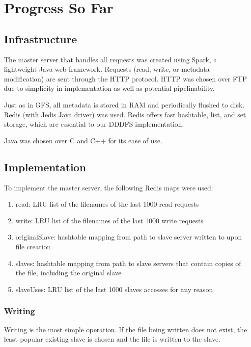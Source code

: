 \documentclass{article}
\begin{document}
\section{Progress So Far}

\subsection{Infrastructure}

The master server that handles all requests was created using Spark, a lightweight Java web framework. Requests (read, write, or metadata modification) are sent through the HTTP protocol. HTTP was chosen over FTP due to simplicity in implementation as well as potential pipelinability. 

Just as in GFS, all metadata is stored in RAM and periodically flushed to disk. Redis (with Jedis Java driver) was used. Redis offers fast hashtable, list, and set storage, which are essential to our DDDFS implementation. 

Java was chosen over C and C++ for its ease of use. 

\subsection{Implementation}

To implement the master server, the following Redis maps were used:
\begin{enumerate}
\item read: LRU list of the filenames of the last 1000 read requests
\item write: LRU list of the filenames of the last 1000 write requests
\item originalSlave: hashtable mapping from path to slave server written to upon file creation
\item slaves: hashtable mapping from path to slave servers that contain copies of the file, including the original slave
\item slaveUses: LRU list of the last 1000 slaves accesses for any reason
\end{enumerate}

\subsubsection{Writing}

Writing is the most simple operation. If the file being written does not exist, the least popular existing slave is chosen and the file is written to the slave. 
\end{document}
